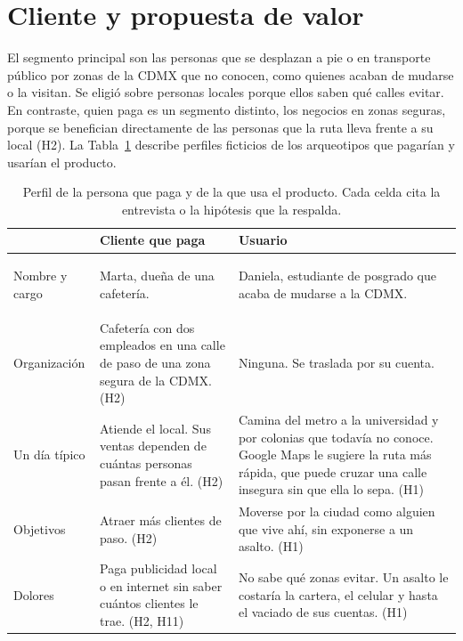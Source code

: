\documentclass[11pt]{article}
\begin{document}
\section{Cliente y propuesta de valor}
\label{sec:cliente}

El segmento principal son las personas que se desplazan a pie o en transporte público por zonas de
la CDMX que no conocen, como quienes acaban de mudarse o la visitan. Se eligió sobre personas locales porque ellos saben qué calles evitar. 
En contraste, quien paga es un segmento distinto, los negocios en zonas seguras, porque se
benefician directamente de las personas que la ruta lleva frente a su local (H2). La
Tabla~\ref{tab:persona} describe perfiles ficticios de los arqueotipos que pagarían y usarían el producto.

\begin{table}[H]
  \caption{Perfil de la persona que paga y de la que usa el producto. Cada celda cita la
    entrevista o la hipótesis que la respalda.}
  \label{tab:persona}
  \small
  \renewcommand{\arraystretch}{1.25}
  \begin{tabularx}{\textwidth}{@{}>{\bfseries\raggedright}p{}
                                  >{\raggedright\arraybackslash}X>{\raggedright\arraybackslash}X@{}}
    \toprule
    & Cliente que paga & Usuario \\
    \midrule
    Nombre y cargo & Marta, dueña de una cafetería. & Daniela, estudiante de posgrado que acaba
                     de mudarse a la CDMX. \\
    Organización & Cafetería con dos empleados en una calle de paso de una zona segura de la
                   CDMX. (H2) & Ninguna. Se traslada por su cuenta. \\
    Un día típico & Atiende el local. Sus ventas dependen de cuántas personas pasan frente a
                    él. (H2) & Camina del metro a la universidad y por colonias que todavía no
                    conoce. Google Maps le sugiere la ruta más rápida, que puede cruzar una calle
                    insegura sin que ella lo sepa. (H1) \\
    Objetivos & Atraer más clientes de paso. (H2) & Moverse por la ciudad como alguien que
                vive ahí, sin exponerse a un asalto. (H1) \\
    Dolores & Paga publicidad local o en internet sin saber cuántos clientes le trae.
              (H2, H11) & No sabe qué zonas evitar. Un asalto le costaría la cartera, el celular
              y hasta el vaciado de sus cuentas. (H1) \\

\end{tabularx}
\end{table}
\end{document}
